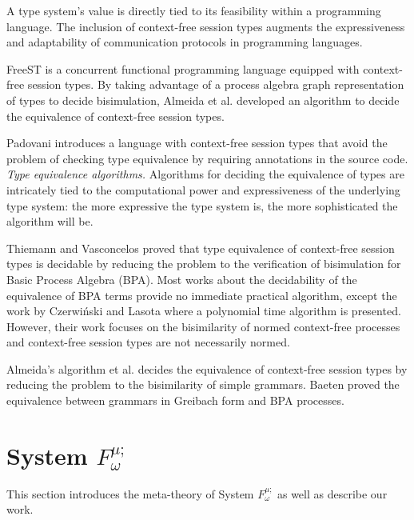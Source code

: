 \documentclass[sigplan]{acmart}
\begin{document}
A type system's value is directly tied to its feasibility within a programming language. The inclusion of context-free session types augments the expressiveness and adaptability of communication protocols in programming languages.

FreeST \cite{AlmeidaMTV22, freest} is a concurrent functional programming language equipped with context-free session types. By taking advantage of a process algebra graph representation of types to decide bisimulation, Almeida et al. \cite{AlmeidaMV20} developed an algorithm to decide the equivalence of context-free session types.

Padovani \cite{DBLP:journals/toplas/Padovani19} introduces a language with context-free session types that avoid the problem of checking type equivalence by requiring annotations in the source code.\\

\textit{Type equivalence algorithms.    }
Algorithms for deciding the equivalence of types are intricately tied to the computational power and expressiveness of the underlying type system: the more expressive the type system is, the more sophisticated the algorithm will be.

Thiemann and Vasconcelos proved that type equivalence of context-free session types is decidable \cite{ThiemannV16} by reducing the problem to the verification of bisimulation for Basic Process Algebra (BPA). Most works about the decidability of the equivalence of BPA terms provide no immediate practical algorithm, except the work by Czerwiński and Lasota \cite{CzerwinskiL10} where a polynomial time algorithm is presented. However, their work focuses on the bisimilarity of normed context-free processes and context-free session types are not necessarily normed. 

Almeida's algorithm et al. \cite{AlmeidaMV20} decides the equivalence of context-free session types by reducing the problem to the bisimilarity of simple grammars. Baeten \cite{BaetenBK93} proved the equivalence between grammars in Greibach form and BPA processes.

\section{System $F^{\mu;}_\omega$} \label{sec:typeop}
This section introduces the meta-theory of System $F^{\mu;}_\omega$ as well as describe our work.
\end{document}
